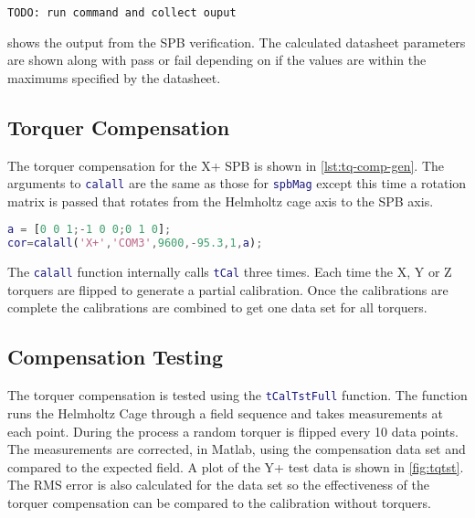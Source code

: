 \begin{lstlisting}[caption={\ac{SPB} verification results},label={lst:vspb-res},language=verbatim]
TODO: run command and collect ouput
\end{lstlisting}

 shows the output from the \ac{SPB} verification. The calculated datasheet parameters are shown along with pass or fail depending on if the values are within the maximums specified by the datasheet.


\subsection{Torquer Compensation}

\label{sec:tq-comp}

The torquer compensation for the X+ \ac{SPB} is shown in \cref{lst:tq-comp-gen}. The arguments to \lstinline[style=code,language=Matlab]$calall$ are the same as those for \lstinline[style=code,language=Matlab]$spbMag$ except this time a rotation matrix is passed that rotates from the Helmholtz cage axis to the \ac{SPB} axis.

\begin{lstlisting}[style=code,caption={Torquer compensation for the X+ \ac{SPB}},label={lst:tq-comp-gen},language=Matlab]
a = [0 0 1;-1 0 0;0 1 0];
cor=calall('X+','COM3',9600,-95.3,1,a);
\end{lstlisting}

The \lstinline[style=code,language=Matlab]$calall$ function internally calls \lstinline[style=code,language=Matlab]$tCal$ three times. Each time the X, Y or Z torquers are flipped to generate a partial calibration. Once the calibrations are complete the calibrations are combined to get one data set for all torquers.

\subsection{Compensation Testing}

The torquer compensation is tested using the \lstinline[style=code,language=Matlab]$tCalTstFull$ function. The function runs the Helmholtz Cage through a field sequence and takes measurements at each point. During the process a random torquer is flipped every 10 data points. The measurements are corrected, in Matlab, using the compensation data set and compared to the expected field. A plot of the Y+ test data is shown in \cref{fig:tqtst}. The RMS error is also calculated for the data set so the effectiveness of the torquer compensation can be compared to the calibration without torquers.

